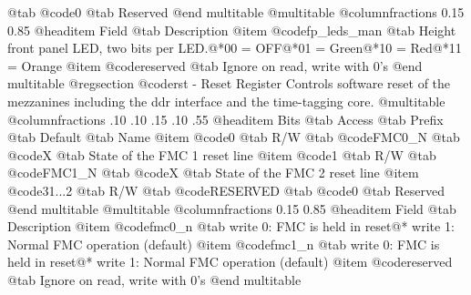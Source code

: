 @tab @code{0} @tab 
Reserved
@end multitable
@multitable @columnfractions 0.15 0.85
@headitem Field @tab Description
@item @code{fp_leds_man} @tab Height front panel LED, two bits per LED.@*00 = OFF@*01 = Green@*10 = Red@*11 = Orange
@item @code{reserved} @tab Ignore on read, write with 0's
@end multitable
@regsection @code{rst} - Reset Register
Controls software reset of the mezzanines including the ddr interface and the time-tagging core.
@multitable @columnfractions .10 .10 .15 .10 .55
@headitem Bits @tab Access @tab Prefix @tab Default @tab Name
@item @code{0}
@tab R/W @tab
@code{FMC0_N}
@tab @code{X} @tab 
State of the FMC 1 reset line
@item @code{1}
@tab R/W @tab
@code{FMC1_N}
@tab @code{X} @tab 
State of the FMC 2 reset line
@item @code{31...2}
@tab R/W @tab
@code{RESERVED}
@tab @code{0} @tab 
Reserved
@end multitable
@multitable @columnfractions 0.15 0.85
@headitem Field @tab Description
@item @code{fmc0_n} @tab write 0: FMC is held in reset@* write 1: Normal FMC operation (default)
@item @code{fmc1_n} @tab write 0: FMC is held in reset@* write 1: Normal FMC operation (default)
@item @code{reserved} @tab Ignore on read, write with 0's
@end multitable
